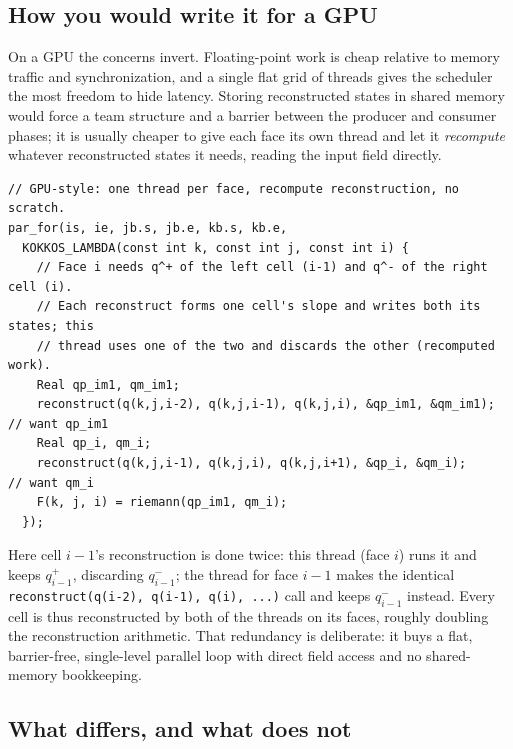 \documentclass[11pt]{article}
\newcommand{\code}[1]{\lstinline[basicstyle=\ttfamily]|#1|}
\begin{document}
\subsection{How you would write it for a GPU}
\label{sec:gpu}

On a GPU the concerns invert. Floating-point work is cheap relative to memory
traffic and synchronization, and a single flat grid of threads gives the
scheduler the most freedom to hide latency. Storing reconstructed states in
shared memory would force a team structure and a barrier between the producer and
consumer phases; it is usually cheaper to give each face its own thread and let it
\emph{recompute} whatever reconstructed states it needs, reading the input field
directly.

\begin{lstlisting}
// GPU-style: one thread per face, recompute reconstruction, no scratch.
par_for(is, ie, jb.s, jb.e, kb.s, kb.e,
  KOKKOS_LAMBDA(const int k, const int j, const int i) {
    // Face i needs q^+ of the left cell (i-1) and q^- of the right cell (i).
    // Each reconstruct forms one cell's slope and writes both its states; this
    // thread uses one of the two and discards the other (recomputed work).
    Real qp_im1, qm_im1;
    reconstruct(q(k,j,i-2), q(k,j,i-1), q(k,j,i), &qp_im1, &qm_im1);  // want qp_im1
    Real qp_i, qm_i;
    reconstruct(q(k,j,i-1), q(k,j,i), q(k,j,i+1), &qp_i, &qm_i);      // want qm_i
    F(k, j, i) = riemann(qp_im1, qm_i);
  });
\end{lstlisting}

Here cell $i-1$'s reconstruction is done twice: this thread (face $i$) runs it and
keeps $q^{+}_{i-1}$, discarding $q^{-}_{i-1}$; the thread for face $i-1$ makes the
identical \code{reconstruct(q(i-2), q(i-1), q(i), ...)} call and keeps $q^{-}_{i-1}$
instead. Every cell is thus reconstructed by both of the threads on its faces,
roughly doubling the reconstruction arithmetic. That redundancy is deliberate: it
buys a flat, barrier-free, single-level parallel loop with direct field access and
no shared-memory bookkeeping.

\subsection{What differs, and what does not}
\label{sec:differs}
\end{document}
